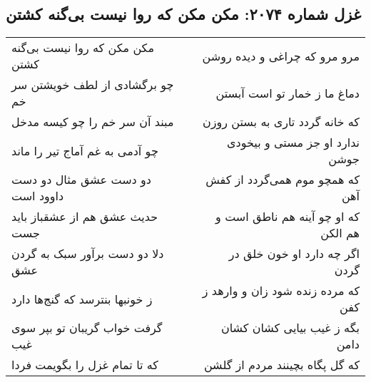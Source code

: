 \begin{center}
\section*{غزل شماره ۲۰۷۴: مکن مکن که روا نیست بی‌گنه کشتن}
\label{sec:2074}
\begin{longtable}{l p{0.5cm} r}
مکن مکن که روا نیست بی‌گنه کشتن
&&
مرو مرو که چراغی و دیده روشن
\\
چو برگشادی از لطف خویشتن سر خم
&&
دماغ ما ز خمار تو است آبستن
\\
مبند آن سر خم را چو کیسه مدخل
&&
که خانه گردد تاری به بستن روزن
\\
چو آدمی به غم آماج تیر را ماند
&&
ندارد او جز مستی و بیخودی جوشن
\\
دو دست عشق مثال دو دست داوود است
&&
که همچو موم همی‌گردد از کفش آهن
\\
حدیث عشق هم از عشقباز باید جست
&&
که او چو آینه هم ناطق است و هم الکن
\\
دلا دو دست برآور سبک به گردن عشق
&&
اگر چه دارد او خون خلق در گردن
\\
ز خونبها بنترسد که گنج‌ها دارد
&&
که مرده زنده شود زان و وارهد ز کفن
\\
گرفت خواب گریبان تو بپر سوی غیب
&&
بگه ز غیب بیایی کشان کشان دامن
\\
که تا تمام غزل را بگویمت فردا
&&
که گل پگاه بچینند مردم از گلشن
\\
\end{longtable}
\end{center}
